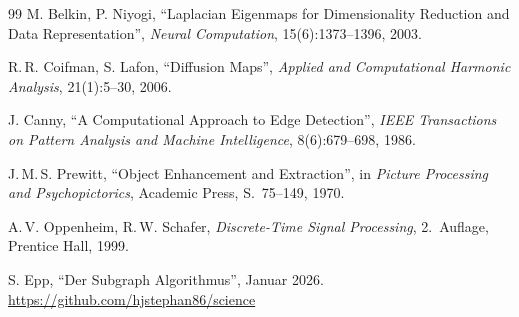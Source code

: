﻿\documentclass[a4paper,12pt]{article}
\theoremstyle{definition}
\begin{document}
\begin{thebibliography}{99}
M. Belkin, P. Niyogi,
``Laplacian Eigenmaps for Dimensionality Reduction and Data Representation'',
\textit{Neural Computation}, 15(6):1373--1396, 2003.

R.\,R. Coifman, S. Lafon,
``Diffusion Maps'',
\textit{Applied and Computational Harmonic Analysis}, 21(1):5--30, 2006.

J. Canny,
``A Computational Approach to Edge Detection'',
\textit{IEEE Transactions on Pattern Analysis and Machine Intelligence},
8(6):679--698, 1986.

J.\,M.\,S. Prewitt,
``Object Enhancement and Extraction'',
in \textit{Picture Processing and Psychopictorics}, Academic Press, S.~75--149, 1970.

A.\,V. Oppenheim, R.\,W. Schafer,
\textit{Discrete-Time Signal Processing}, 2.~Auflage,
Prentice Hall, 1999.

S. Epp,
``Der Subgraph Algorithmus'', Januar 2026.
\url{https://github.com/hjstephan86/science}

\end{thebibliography}
\end{document}
